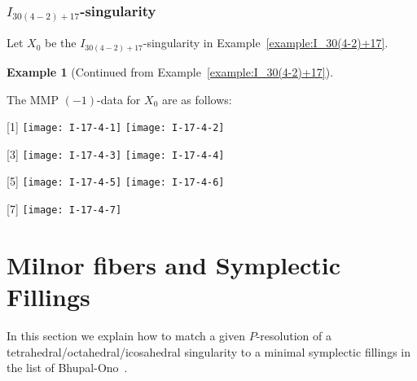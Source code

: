 \documentclass[reqno, twoside, a4paper]{amsart}
\theoremstyle{definition}
\newtheorem{example}[theorem]{Example}
\numberwithin{equation}{section}
\begin{document}
\begin{multicols}{2}
\begin{center}
\end{center}
\end{multicols}





\subsubsection{$I_{30(4-2)+17}$-singularity}

Let $X_0$ be the $I_{30(4-2)+17}$-singularity in Example~\ref{example:I_30(4-2)+17}.

\begin{example}[Continued from Example~\ref{example:I_30(4-2)+17}]
\label{example:MMP-(-1)-data-I_30(4-2)+17}

The MMP $(-1)$-data for $X_0$ are as follows:

\begin{center}
[1] \texttt{[image: I-17-4-1]} \quad
[2] \texttt{[image: I-17-4-2]}

[3] \texttt{[image: I-17-4-3]} \quad
[4] \texttt{[image: I-17-4-4]}

[5] \texttt{[image: I-17-4-5]} \quad
[6] \texttt{[image: I-17-4-6]}

[7] \texttt{[image: I-17-4-7]}
\end{center}
\end{example}




\section{Milnor fibers and Symplectic Fillings}
\label{section:Milnor-vs-filling}

In this section we explain how to match a given $P$-resolution of a tetrahedral/octahedral/icosahedral singularity to a minimal symplectic fillings in the list of Bhupal-Ono~\cite{Bhupal-Ono-2012}.
\end{document}
